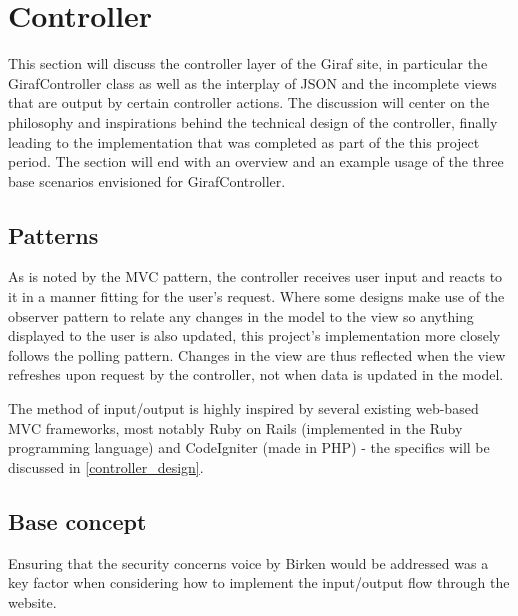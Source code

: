 \section{Controller}
\label{controller}
This section will discuss the controller layer of the Giraf site, in particular the GirafController class as well as the interplay of JSON and the incomplete views that are output by certain controller actions. The discussion will center on the philosophy and inspirations behind the technical design of the controller, finally leading to the implementation that was completed as part of the this project period. The section will end with an overview and an example usage of the three base scenarios envisioned for GirafController.

\subsection{Patterns}
As is noted by the MVC pattern, the controller receives user input and reacts to it in a manner fitting for the user's request. Where some designs make use of the observer pattern to relate any changes in the model to the view so anything displayed to the user is also updated, this project's implementation more closely follows the polling pattern. Changes in the view are thus reflected when the view refreshes upon request by the controller, not when data is updated in the model.

The method of input/output is highly inspired by several existing web-based MVC frameworks, most notably Ruby on Rails (implemented in the Ruby programming language) and CodeIgniter (made in PHP) - the specifics will be discussed in \vref{controller_design}.

\subsection{Base concept}
Ensuring that the security concerns voice by Birken  would be addressed was a key factor when considering how to implement the input/output flow through the website. 

